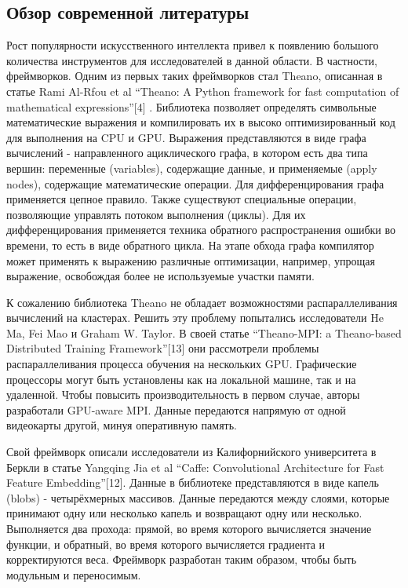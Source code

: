 \subsection{Обзор современной литературы}
	Рост популярности искусственного интеллекта привел к появлению большого количества инструментов для исследователей в данной области. В частности, фреймворков. Одним из первых таких фреймворков стал Theano, описанная в статье Rami Al-Rfou et al “Theano: A Python framework for fast computation of mathematical expressions”[4] . Библиотека позволяет определять символьные математические выражения и компилировать их в высоко оптимизированный код для выполнения на CPU и GPU. Выражения представляются в виде графа вычислений - направленного ациклического графа, в котором есть два типа вершин: переменные (variables), содержащие данные, и применяемые (apply nodes), содержащие математические операции. Для дифференцирования графа применяется цепное правило. Также существуют специальные операции, позволяющие управлять потоком выполнения (циклы). Для их дифференцирования применяется техника обратного распространения ошибки во времени, то есть в виде обратного цикла. На этапе обхода графа компилятор может применять к выражению различные оптимизации, например, упрощая выражение, освобождая более не используемые участки памяти.
\par
К сожалению библиотека Theano не обладает возможностями распараллеливания вычислений на кластерах. Решить эту проблему попытались исследователи He Ma, Fei Mao и Graham W. Taylor. В своей статье “Theano-MPI: a Theano-based Distributed Training Framework”[13] они рассмотрели проблемы распараллеливания процесса обучения на нескольких GPU. Графические процессоры могут быть установлены как на локальной машине, так и на удаленной. Чтобы повысить производительность в первом случае, авторы разработали GPU-aware MPI. Данные передаются напрямую от одной видеокарты другой, минуя оперативную память.
\par
Свой фреймворк описали исследователи из Калифорнийского университета в Беркли в статье Yangqing Jia et al “Caffe: Convolutional Architecture for Fast Feature Embedding”[12]. Данные в библиотеке представляются в виде капель (blobs) - четырёхмерных массивов. Данные передаются между слоями, которые принимают одну или несколько капель и возвращают одну или несколько. Выполняется два прохода: прямой, во время которого вычисляется значение функции, и обратный, во время которого вычисляется градиента и корректируются веса. Фреймворк разработан таким образом, чтобы быть модульным и переносимым.

